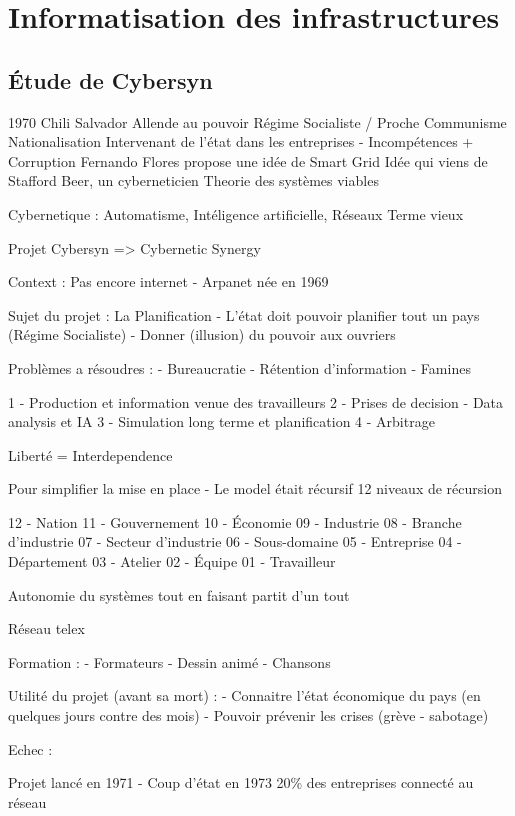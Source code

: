 \chapter{Informatisation des infrastructures}

\section{Étude de Cybersyn}

1970 Chili
Salvador Allende au pouvoir
Régime Socialiste / Proche Communisme
Nationalisation
Intervenant de l'état dans les entreprises - Incompétences + Corruption
Fernando Flores propose une idée de Smart Grid
Idée qui viens de Stafford Beer, un cyberneticien
Theorie des systèmes viables

Cybernetique : Automatisme, Intéligence artificielle, Réseaux
Terme vieux

Projet Cybersyn => Cybernetic Synergy

Context : Pas encore internet - Arpanet née en 1969

Sujet du projet : La Planification
- L'état doit pouvoir planifier tout un pays (Régime Socialiste)
- Donner (illusion) du pouvoir aux ouvriers

Problèmes a résoudres :
- Bureaucratie
- Rétention d'information
- Famines


1 - Production et information venue des travailleurs
2 - Prises de decision - Data analysis et IA
3 - Simulation long terme et planification
4 - Arbitrage

Liberté = Interdependence

Pour simplifier la mise en place - Le model était récursif
12 niveaux de récursion

12 - Nation
11 - Gouvernement
10 - Économie
09 - Industrie
08 - Branche d'industrie
07 - Secteur d'industrie
06 - Sous-domaine
05 - Entreprise
04 - Département
03 - Atelier
02 - Équipe
01 - Travailleur

Autonomie du systèmes tout en faisant partit d'un tout

Réseau telex

Formation :
- Formateurs
- Dessin animé
- Chansons

Utilité du projet (avant sa mort) :
- Connaitre l'état économique du pays (en quelques jours contre des mois)
- Pouvoir prévenir les crises (grève - sabotage)

Echec :

Projet lancé en 1971 - Coup d'état en 1973
20\% des entreprises connecté au réseau

